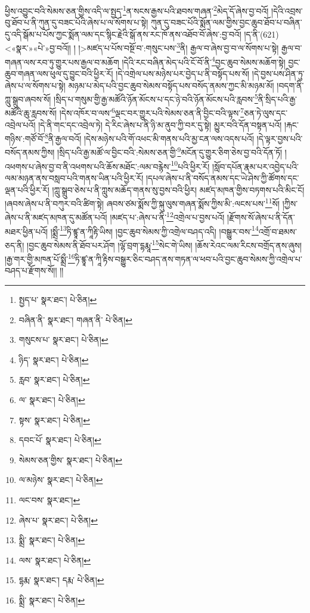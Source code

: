 ཕྱིས་འབྱུང་བའི་སེམས་ཅན་གྱིས་འདི་ལ་སྤྱད་\footnote{སྤྱད་པ་  སྣར་ཐང་།  པེ་ཅིན། }ན་སངས་རྒྱས་པའི་ཐབས་གཞན་\footnote{བཞིན་ནི་  སྣར་ཐང་། གཞན་ནི་  པེ་ཅིན། }མེད་དོ་ཞེས་བྱ་བའོ། །དེའི་འབྲས་བུ་ཐོབ་པ་ནི་ཀུན་དུ་བཟང་པོའི་ཞེས་པ་ལ་སོགས་པ་སྟེ། ཀུན་དུ་བཟང་པོའི་སྨོན་ལམ་གྱིས་བྱང་ཆུབ་ཐོབ་པ་བཞིན་དུ་འདི་སྒོམ་པ་པོས་ཀྱང་སྨོན་ལམ་དང་སྙིང་རྗེའི་སྒོ་ནས་རང་ཁོ་ནས་འཐོབ་བོ་ཞེས་:བྱ་བའོ། །ད་ནི་(621) <«སྣར་»«པེ་»བྱ་བའོ།། །
།>མཛད་པ་པོས་བསྔོ་བ་:གསུང་པས་\footnote{གསུངས་པ་  སྣར་ཐང་།  པེ་ཅིན། }ནི། རྒྱལ་བ་ཞེས་བྱ་བ་ལ་སོགས་པ་སྟེ། རྒྱལ་བ་གཞན་ལས་རབ་ཏུ་གྱུར་པས་རྒྱལ་བ་མཆོག །དེའི་རང་བཞིན་མེད་པའི་ངོ་བོ་ནི་\footnote{ཉིད་  སྣར་ཐང་།  པེ་ཅིན། }བྱང་ཆུབ་སེམས་མཆོག་སྟེ། བྱང་ཆུབ་གཞན་ལས་ཕུལ་དུ་བྱུང་བའི་ཕྱིར་རོ། །དེ་འགྲེལ་པས་མཉེས་པར་བྱེད་པ་ནི་བསྟོད་པས་སོ། །དེ་བྱས་པས་ཤིན་ཏུ་ཞེས་པ་ལ་སོགས་པ་སྟེ། མཉམ་པ་མེད་པའི་བྱང་ཆུབ་སེམས་བསྟོད་པས་བསོད་ནམས་ཀྱང་མི་མཉམ་མོ། །བདག་ནི་ཀླུ་སྒྲུབ་ཞབས་སོ། །སྲིད་པ་གསུམ་གྱི་རྒྱ་མཚོའི་ཉོན་མོངས་པ་དང་ཉེ་བའི་ཉོན་མོངས་པའི་རླབས་\footnote{རླབ་  སྣར་ཐང་།  པེ་ཅིན། }ནི་སྲིད་པའི་རྒྱ་མཚོའི་ཆུ་རླབས་སོ། །དེས་འཁོར་བ་ལས་\footnote{ལ་  སྣར་ཐང་།  པེ་ཅིན། }ལྡང་བར་གྱུར་པའི་སེམས་ཅན་ནི་བྱིང་བའི་ལྟས་\footnote{སྟས་  སྣར་ཐང་།  པེ་ཅིན། }ཅན་ཏེ་ལུས་དང་འབྲེལ་པའོ། །དེ་ནི་གང་དང་འབྲེལ་ཏེ། དེ་རིང་ཞེས་པ་ནི་ཉི་མ་ནུབ་ཀྱི་བར་དུ་སྟེ། མྱུར་བའི་དོན་བསྟན་པའོ། །རྐང་གཉིས་:གཙོ་བོ་\footnote{དབང་པོ་  སྣར་ཐང་།  པེ་ཅིན། }ནི་རྒྱལ་བའོ། །དེས་མཉེས་པའི་གོ་འཕང་མི་གནས་པའི་མྱ་ངན་ལས་འདས་པའོ། །དེ་ལྟར་བྱས་པའི་བསོད་ནམས་ཀྱིས། །སྲིད་པའི་རྒྱ་མཚོ་ལ་བྱིང་བའི་:སེམས་ཅན་གྱི་\footnote{སེམས་ཅན་གྱིས་  སྣར་ཐང་།  པེ་ཅིན། }མངོན་དུ་གྱུར་ཅིག་ཅེས་བྱ་བའི་དོན་ཏོ། །འཕགས་པ་ཞེས་བྱ་བ་ནི་འཕགས་པའི་ཆོས་མཐོང་:ལམ་བརྙེས་\footnote{ལ་མཉེས་  སྣར་ཐང་།  པེ་ཅིན། }པའི་ཕྱིར་རོ། །སློབ་དཔོན་རྣམ་པར་འབྱེད་པའི་ལམ་མཉན་ནས་བསླབ་པའི་གནས་ཡིན་པའི་ཕྱིར་རོ། །དཔལ་ཞེས་པ་ནི་བསོད་ནམས་དང་ཡེ་ཤེས་ཀྱི་ཚོགས་དང་ལྡན་པའི་ཕྱིར་རོ། །ཀླུ་སྒྲུབ་ཅེས་པ་ནི་ཀླུས་མཆོད་གནས་སུ་བྱས་བའི་ཕྱིར། མཛད་མཁན་གྱིས་བཏགས་པའི་མིང་ངོ། །ཞབས་ཞེས་པ་ནི་བཀུར་བའི་ཚིག་སྟེ། ཞབས་ཙམ་སྨོས་ཀྱི་སྐུ་ལུས་གཞན་སྨོས་ཀྱིས་མི་:ལངས་པས་\footnote{ལང་བས་  སྣར་ཐང་། }སོ། །ཀྱིས་ཞེས་པ་ནི་མཛད་མཁན་དུ་མཚོན་པའོ། །མཛད་པ་:ཞེས་པ་ནི་\footnote{ཞེས་པ་  སྣར་ཐང་།  པེ་ཅིན། }འགྲེལ་པ་བྱས་པའོ། །རྫོགས་སོ་ཞེས་པ་ནི་དོན་མཐར་ཕྱིན་པའོ། །སྨྲྀ་\footnote{སྨྲི་  སྣར་ཐང་།  པེ་ཅིན། }ཏི་ཛྙཱ་ན་ཀཱིརྟི་ཡིས། །བྱང་ཆུབ་སེམས་ཀྱི་འགྲེལ་བཤད་འདི། །བསྒྱུར་བས་\footnote{ལས་  སྣར་ཐང་།  པེ་ཅིན། }འགྲོ་བ་ཐམས་ཅད་ནི། །བྱང་ཆུབ་སེམས་ནི་ཐོབ་པར་ཤོག །ལྷོ་བྲག་དྷརྨཱ་\footnote{དྷརྨ་  སྣར་ཐང་། དརྨ་  པེ་ཅིན། }སེང་གེ་ཡིས། །ཆོས་རེའང་ལམ་རིངས་བགྲོད་ནས་ཞུས། །རྒྱ་གར་གྱི་མཁན་པོ་སྨྲྀ་\footnote{སྨྲི་  སྣར་ཐང་།  པེ་ཅིན། }ཏི་ཛྙཱ་ན་ཀཱི་རྟིས་བསྒྱུར་ཅིང་བཤད་ནས་གཏན་ལ་ཕབ་པའི་བྱང་ཆུབ་སེམས་ཀྱི་འགྲེལ་པ་བཤད་པ་རྫོགས་སོ།། །།